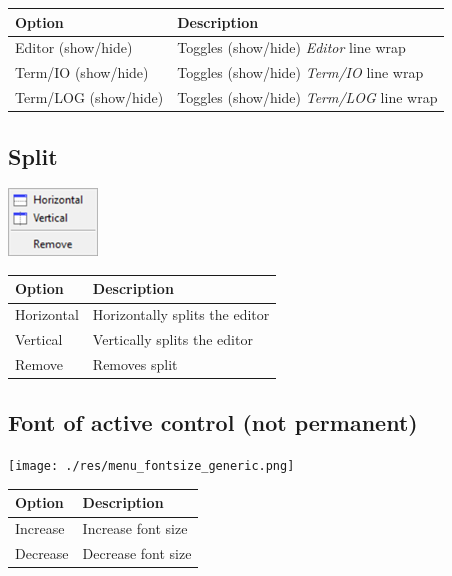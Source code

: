 \begin{scriptsize}
  \begin{tabularx}{\textwidth}{>{\hsize=0.3\hsize}X>{\hsize=0.7\hsize}X}\\
    \hline
    \textbf{Option} & \textbf{Description} \\
    \hline
    Editor (show/hide) & Toggles (show/hide) \textit{Editor} line wrap \\
    Term/IO (show/hide) & Toggles (show/hide) \textit{Term/IO} line wrap \\
    Term/LOG (show/hide) & Toggles (show/hide) \textit{Term/LOG} line wrap \\
    \hline
  \end{tabularx}
\end{scriptsize}


\hypertarget{menu_view_split}{}
\subsection{Split}

\includegraphics[scale=0.8]{./res/menu_view_split.png}\\

\begin{scriptsize}
  \begin{tabularx}{\textwidth}{>{\hsize=0.3\hsize}X>{\hsize=0.7\hsize}X}\\
    \hline
    \textbf{Option} & \textbf{Description} \\
    \hline
    Horizontal & Horizontally splits the editor \\
    Vertical & Vertically splits the editor \\
    Remove & Removes split \\
    \hline
  \end{tabularx}
\end{scriptsize}


\hypertarget{menu_view_fontsize}{}
\subsection{Font of active control (not permanent)}

\texttt{[image: ./res/menu\_fontsize\_generic.png]}\\

\begin{scriptsize}
  \begin{tabularx}{\textwidth}{>{\hsize=0.3\hsize}X>{\hsize=0.7\hsize}X}\\
    \hline
    \textbf{Option} & \textbf{Description} \\
    \hline
    Increase & Increase font size \\
    Decrease & Decrease font size \\
    \hline
  \end{tabularx}
\end{scriptsize}
